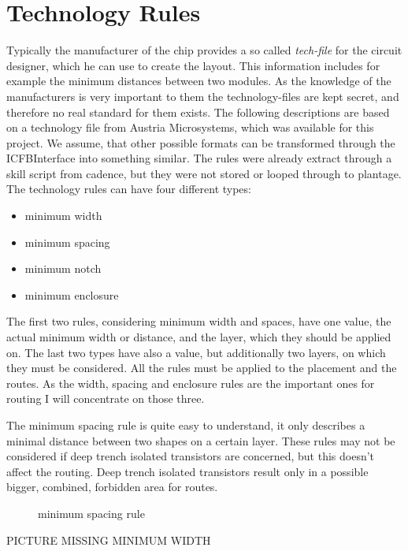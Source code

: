 \section{Technology Rules}
Typically the manufacturer of the chip provides a so called \textit{tech-file} for the circuit designer, which he can use to create the layout. This information includes for example the minimum distances between two modules. As the knowledge of the manufacturers is very important to them the technology-files are kept secret, and therefore no real standard for them exists. The following descriptions are based on a technology file from Austria Microsystems, which was available for this project. We assume, that other possible formats can be transformed through the ICFBInterface into something similar. The rules were already extract through a skill script from cadence, but they were not stored or looped through to plantage. The technology rules can have four different types:

\begin{itemize}
\item minimum width
\item minimum spacing
\item minimum notch
\item minimum enclosure
\end{itemize}

The first two rules, considering minimum width and spaces, have one value, the actual minimum width or distance, and the layer, which they should be applied on. The last two types have also a value, but additionally two layers, on which they must be considered. All the rules must be applied to the placement and the routes. As the width, spacing and enclosure rules are the important ones for routing I will concentrate on those three.

The minimum spacing rule is quite easy to understand, it only describes a minimal distance between two shapes on a certain layer. These rules may not be considered if deep trench isolated transistors are concerned, but this doesn't affect the routing. Deep trench isolated transistors result only in a possible bigger, combined, forbidden area for routes.

\begin{figure}
	\centering
	
	\caption{minimum spacing rule}
	\label{fig:technology_rule_spacing}
\end{figure}

PICTURE MISSING MINIMUM WIDTH

